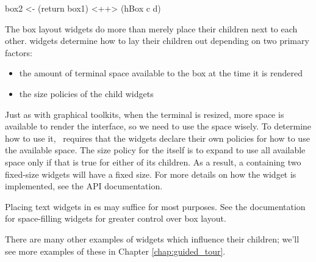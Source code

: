 \begin{haskellcode}
 box2 <- (return box1) <++> (hBox c d)
\end{haskellcode}

The box layout widgets do more than merely place their children next
to each other.   widgets determine how to lay their children
out depending on two primary factors:

\begin{itemize}
\item the amount of terminal space available to the box at the time it
      is rendered
\item the size policies of the child widgets
\end{itemize}

Just as with graphical toolkits, when the terminal is resized, more
space is available to render the interface, so we need to use the
space wisely.  To determine how to use it, \vtyui\ requires that the
widgets declare their own policies for how to use the available space.
The size policy for the  itself is to expand to use all
available space only if that is true for either of its children.  As a
result, a  containing two fixed-size widgets will have a fixed
size.  For more details on how the  widget is implemented, see
the API documentation.

Placing text widgets in es may suffice for most purposes.  See
the documentation for space-filling widgets for greater control over
box layout.

There are many other examples of widgets which influence their
children; we'll see more examples of these in Chapter
\ref{chap:guided_tour}.
